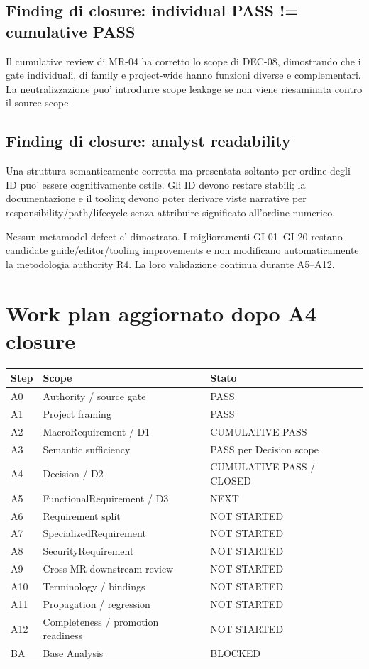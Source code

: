 \documentclass[11pt,a4paper]{article}
\begin{document}
\subsection{Finding di closure: individual PASS != cumulative PASS}
Il cumulative review di MR-04 ha corretto lo scope di DEC-08, dimostrando che i gate individuali, di family e project-wide hanno funzioni diverse e complementari. La neutralizzazione puo' introdurre scope leakage se non viene riesaminata contro il source scope.

\subsection{Finding di closure: analyst readability}
Una struttura semanticamente corretta ma presentata soltanto per ordine degli ID puo' essere cognitivamente ostile. Gli ID devono restare stabili; la documentazione e il tooling devono poter derivare viste narrative per responsibility/path/lifecycle senza attribuire significato all'ordine numerico.

\begin{ddtaprinciple}[title={Methodology disposition al freeze A4}]
Nessun metamodel defect e' dimostrato. I miglioramenti GI-01--GI-20 restano candidate guide/editor/tooling improvements e non modificano automaticamente la metodologia authority R4. La loro validazione continua durante A5--A12.
\end{ddtaprinciple}

\clearpage
\section{Work plan aggiornato dopo A4 closure}
\begin{tabularx}{\textwidth}{L{16mm}Y L{42mm}}
\toprule
\textbf{Step} & \textbf{Scope} & \textbf{Stato} \\
\midrule
A0 & Authority / source gate & PASS \\
A1 & Project framing & PASS \\
A2 & MacroRequirement / D1 & CUMULATIVE PASS \\
A3 & Semantic sufficiency & PASS per Decision scope \\
A4 & Decision / D2 & CUMULATIVE PASS / CLOSED \\
A5 & FunctionalRequirement / D3 & NEXT \\
A6 & Requirement split & NOT STARTED \\
A7 & SpecializedRequirement & NOT STARTED \\
A8 & SecurityRequirement & NOT STARTED \\
A9 & Cross-MR downstream review & NOT STARTED \\
A10 & Terminology / bindings & NOT STARTED \\
A11 & Propagation / regression & NOT STARTED \\
A12 & Completeness / promotion readiness & NOT STARTED \\
BA & Base Analysis & BLOCKED \\
\bottomrule
\end{tabularx}
\end{document}
